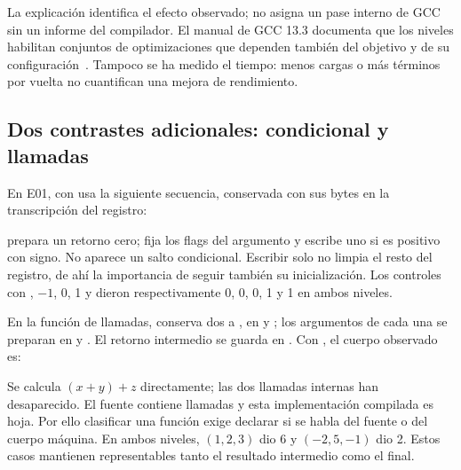 La explicación identifica el efecto observado; no asigna un pase interno de GCC
sin un informe del compilador. El manual de GCC 13.3 documenta que los niveles
habilitan conjuntos de optimizaciones que dependen también del objetivo y de su
configuración~\parencite[apartado~3.11]{gcc133opt}. Tampoco se ha medido el tiempo:
menos cargas o más términos por vuelta no cuantifican una mejora de rendimiento.

\subsection{Dos contrastes adicionales: condicional y llamadas}

En E01,  con  usa la siguiente secuencia,
conservada con sus bytes en la transcripción del registro:

\begin{bloquecodigo}

\end{bloquecodigo}

 prepara un retorno cero;  fija los
flags del argumento y  escribe uno si es positivo con signo.
No aparece un salto condicional. Escribir solo  no limpia el resto
del registro, de ahí la importancia de seguir también su inicialización.
Los controles con , $-1$, 0, 1 y 
dieron respectivamente 0, 0, 0, 1 y 1 en ambos niveles.

En la función de llamadas,  conserva dos  a
, en  y ; los argumentos
de cada una se preparan en  y . El retorno intermedio
se guarda en \codigo{[rbp-0x4]}. Con , el cuerpo observado es:

\begin{bloquecodigo}

\end{bloquecodigo}

Se calcula $(x+y)+z$ directamente; las dos llamadas internas han desaparecido.
El fuente contiene llamadas y esta implementación compilada es hoja. Por ello
clasificar una función exige declarar si se habla del fuente o del cuerpo máquina.
En ambos niveles, $(1,2,3)$ dio 6 y $(-2,5,-1)$ dio 2. Estos casos mantienen
representables tanto el resultado intermedio como el final.

